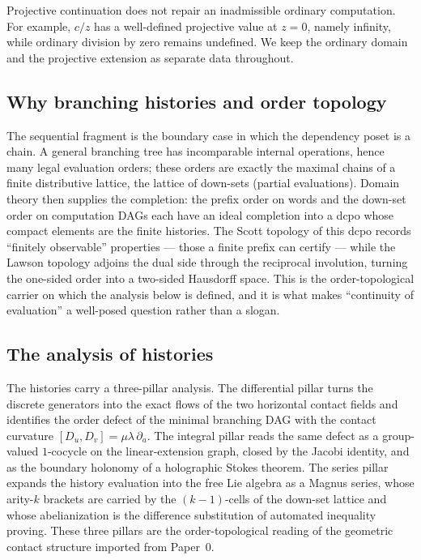 Projective continuation does not repair an inadmissible ordinary computation.  For
example, $c/z$ has a well-defined projective value at $z=0$, namely infinity, while
ordinary division by zero remains undefined.  We keep the ordinary domain and the
projective extension as separate data throughout.

\subsection{Why branching histories and order topology}

The sequential fragment is the boundary case in which the dependency poset is a
chain.  A general branching tree has incomparable internal operations, hence many
legal evaluation orders; these orders are exactly the maximal chains of a finite
distributive lattice, the lattice of down-sets (partial evaluations).  Domain
theory then supplies the completion: the prefix order on words and the down-set
order on computation DAGs each have an ideal completion into a dcpo whose compact
elements are the finite histories.  The Scott topology of this dcpo records
``finitely observable'' properties --- those a finite prefix can certify --- while
the Lawson topology adjoins the dual side through the reciprocal involution,
turning the one-sided order into a two-sided Hausdorff space.  This is the
order-topological carrier on which the analysis below is defined, and it is what
makes ``continuity of evaluation'' a well-posed question rather than a slogan.

\subsection{The analysis of histories}

The histories carry a three-pillar analysis.  The differential pillar turns the
discrete generators into the exact flows of the two horizontal contact fields and
identifies the order defect of the minimal branching DAG with the contact
curvature $[D_u,D_v]=\mu\lambda\,\partial_a$.  The integral pillar reads the same
defect as a group-valued $1$-cocycle on the linear-extension graph, closed by the
Jacobi identity, and as the boundary holonomy of a holographic Stokes theorem.
The series pillar expands the history evaluation into the free Lie algebra as a
Magnus series, whose arity-$k$ brackets are carried by the $(k-1)$-cells of the
down-set lattice and whose abelianization is the difference substitution of
automated inequality proving.  These three pillars are the order-topological
reading of the geometric contact structure imported from Paper~0.

